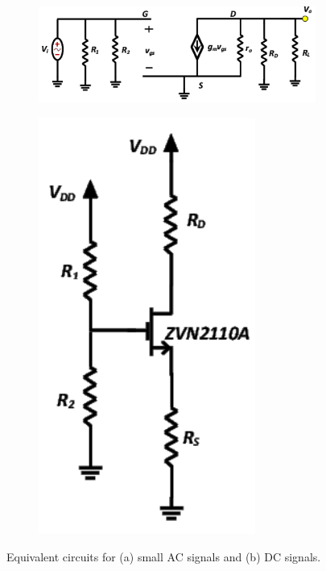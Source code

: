 \documentclass{report}
\begin{document}
\begin{figure}[H]
	\centering
	\begin{subfigure}{0.55\textwidth}
		\centering
		\includegraphics[width=\linewidth]{exp1cktac}
		\caption{}
		\label{fig:exp1cktac}
	\end{subfigure}
	\hfill
	\begin{subfigure}{0.14\textwidth}
		\centering
		\includegraphics[width=\linewidth]{exp1cktdc}
		\caption{}
		\label{fig:exp1cktdc}
	\end{subfigure}
	\caption{Equivalent circuits for (a) small AC signals and (b) DC signals.}
\end{figure}
\end{document}
